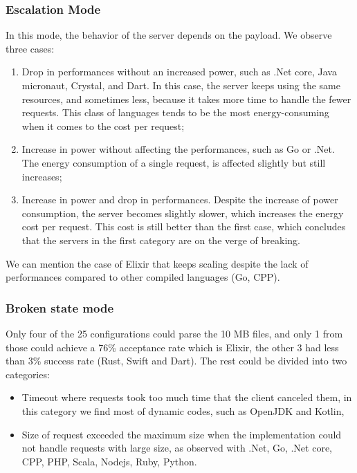 \subsubsection{Escalation Mode}
In this mode, the behavior of the server depends on the payload. We observe three cases:
\begin{enumerate}
    \item Drop in performances without an increased power, such as .Net core, Java micronaut, Crystal, and Dart.
          In this case, the server keeps using the same resources, and sometimes less, because it takes more time to handle the fewer requests.
          This class of languages tends to be the most energy-consuming when it comes to the cost per request;
    \item Increase in power without affecting the performances, such as Go or .Net.
          The energy consumption of a single request, is affected slightly but still increases;
    \item Increase in power and drop in performances.
          Despite the increase of power consumption, the server becomes slightly slower, which increases the energy cost per request.
          This cost is still better than the first case, which concludes that the servers in the first category are on the verge of breaking.
\end{enumerate}

We can mention the case of Elixir that keeps scaling despite the lack of performances compared to other compiled languages (Go, CPP).

\subsubsection{Broken state mode }
Only four of the 25 configurations could parse the 10 MB files, and only 1 from those could achieve a 76\% acceptance rate which is Elixir, the other 3 had less than 3\% success rate (Rust, Swift and Dart).
The rest could be divided into two categories:
\begin{itemize}
    \item \textsf{Timeout} where requests took too much time that the client canceled them, in this category we find most of dynamic codes, such as OpenJDK and Kotlin,
    \item \textsf{Size of request} exceeded the maximum size when the implementation could not handle requests with large size, as observed with .Net, Go, .Net core, CPP, PHP, Scala, Nodejs, Ruby, Python.
\end{itemize}


